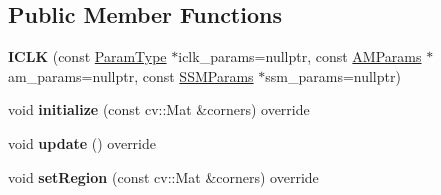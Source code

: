 \subsection*{Public Member Functions}
\begin{DoxyCompactItemize}
\item 
\hypertarget{classICLK_af0a58581126b936bc65d4d0ae83bf8f4}{{\bfseries I\-C\-L\-K} (const \hyperlink{structICLKParams}{Param\-Type} $\ast$iclk\-\_\-params=nullptr, const \hyperlink{structAMParams}{A\-M\-Params} $\ast$am\-\_\-params=nullptr, const \hyperlink{structSSMParams}{S\-S\-M\-Params} $\ast$ssm\-\_\-params=nullptr)}\label{classICLK_af0a58581126b936bc65d4d0ae83bf8f4}

\item 
\hypertarget{classICLK_a2850eda56cffa035f8dc624473bcbd40}{void {\bfseries initialize} (const cv\-::\-Mat \&corners) override}\label{classICLK_a2850eda56cffa035f8dc624473bcbd40}

\item 
\hypertarget{classICLK_ac53506808de6a0eb3859427c18445735}{void {\bfseries update} () override}\label{classICLK_ac53506808de6a0eb3859427c18445735}

\item 
\hypertarget{classICLK_a7fe543f27a9d6a2400208c8aadcb760f}{void {\bfseries set\-Region} (const cv\-::\-Mat \&corners) override}\label{classICLK_a7fe543f27a9d6a2400208c8aadcb760f}

\end{DoxyCompactItemize}

